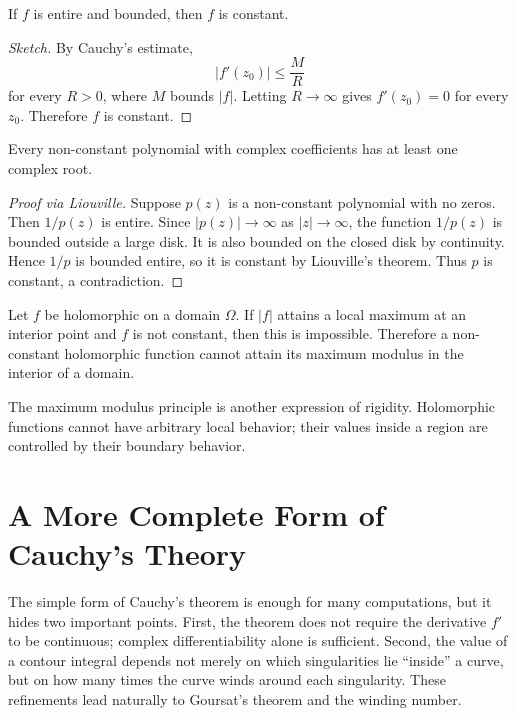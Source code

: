 \begin{theorem}
If $f$ is entire and bounded, then $f$ is constant.
\end{theorem}

\begin{proof}[Sketch]
By Cauchy's estimate,
\[
    |f'(z_0)|\leq \frac{M}{R}
\]
for every $R>0$, where $M$ bounds $|f|$. Letting $R\to\infty$ gives $f'(z_0)=0$ for every $z_0$. Therefore $f$ is constant.
\end{proof}

\begin{theorem}
Every non-constant polynomial with complex coefficients has at least one complex root.
\end{theorem}

\begin{proof}[Proof via Liouville]
Suppose $p(z)$ is a non-constant polynomial with no zeros. Then $1/p(z)$ is entire. Since $|p(z)|\to\infty$ as $|z|\to\infty$, the function $1/p(z)$ is bounded outside a large disk. It is also bounded on the closed disk by continuity. Hence $1/p$ is bounded entire, so it is constant by Liouville's theorem. Thus $p$ is constant, a contradiction.
\end{proof}



\begin{theorem}
Let $f$ be holomorphic on a domain $\Omega$. If $|f|$ attains a local maximum at an interior point and $f$ is not constant, then this is impossible. Therefore a non-constant holomorphic function cannot attain its maximum modulus in the interior of a domain.
\end{theorem}

\begin{remark}
The maximum modulus principle is another expression of rigidity. Holomorphic functions cannot have arbitrary local behavior; their values inside a region are controlled by their boundary behavior.
\end{remark}


\section{A More Complete Form of Cauchy's Theory}

The simple form of Cauchy's theorem is enough for many computations, but it hides two important points. First, the theorem does not require the derivative $f'$ to be continuous; complex differentiability alone is sufficient. Second, the value of a contour integral depends not merely on which singularities lie ``inside'' a curve, but on how many times the curve winds around each singularity. These refinements lead naturally to Goursat's theorem and the winding number.

